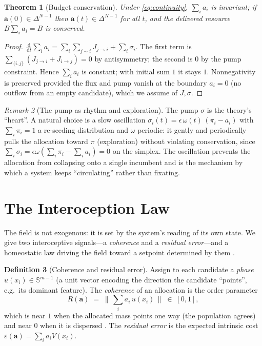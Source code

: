 \documentclass[11pt,a4paper]{article}
\theoremstyle{plain}
\newtheorem{theorem}{Theorem}[section]
\theoremstyle{definition}
\newtheorem{definition}[theorem]{Definition}
\theoremstyle{remark}
\newtheorem{remark}[theorem]{Remark}
\newcommand{\Unit}{[0,1]}
\newcommand{\simplex}{\Delta}                 %
\newcommand{\alloc}{\mathbf{a}}               %
\newcommand{\coh}{R}                           %
\newcommand{\dd}{\,\mathrm{d}}
\begin{document}
\begin{theorem}[Budget conservation]
\label{thm:conservation}
Under \cref{eq:continuity}, $\sum_i a_i$ is invariant; if $\alloc(0)\in
\simplex^{N-1}$ then $\alloc(t)\in\simplex^{N-1}$ for all $t$, and the delivered
resource $B\sum_i a_i=B$ is conserved.
\end{theorem}
\begin{proof}
$\frac{\dd}{\dd t}\sum_i a_i=\sum_i\sum_{j\sim i}J_{j\to i}+\sum_i\sigma_i$. The
first term is $\sum_{\{i,j\}}(J_{j\to i}+J_{i\to j})=0$ by antisymmetry; the
second is $0$ by the pump constraint. Hence $\sum_i a_i$ is constant; with
initial sum $1$ it stays $1$. Nonnegativity is preserved provided the flux and
pump vanish at the boundary $a_i=0$ (no outflow from an empty candidate), which
we assume of $J,\sigma$.
\end{proof}

\begin{remark}[The pump as rhythm and exploration]
The pump $\sigma$ is the theory's ``heart''. A natural choice is a slow
oscillation $\sigma_i(t)=\epsilon\,\omega(t)\,(\pi_i-a_i)$ with
$\sum_i\pi_i=1$ a re-seeding distribution and $\omega$ periodic: it gently and
periodically pulls the allocation toward $\pi$ (exploration) without violating
conservation, since $\sum_i\sigma_i=\epsilon\omega(\sum_i\pi_i-\sum_i a_i)=0$ on
the simplex. The oscillation prevents the allocation from collapsing onto a
single incumbent and is the mechanism by which a system keeps ``circulating''
rather than fixating.
\end{remark}

\section{The Interoception Law}
\label{sec:interoception}

The field is not exogenous: it is set by the system's reading of its own state.
We give two interoceptive signals---a \emph{coherence} and a \emph{residual
error}---and a homeostatic law driving the field toward a setpoint determined by
them \citep{cannon1929,ashby1960,astrom2008}.

\begin{definition}[Coherence and residual error]
\label{def:coherence}
Assign to each candidate a \emph{phase} $u(x_i)\in\mathbb{S}^{m-1}$ (a unit
vector encoding the direction the candidate ``points'', e.g.\ its dominant
feature). The \emph{coherence} of an allocation is the order parameter
\begin{equation}
\coh(\alloc)\;=\;\Big\lVert\,\sum_i a_i\,u(x_i)\,\Big\rVert\;\in\;\Unit,
\label{eq:coherence}
\end{equation}
which is near $1$ when the allocated mass points one way (the population agrees)
and near $0$ when it is dispersed \citep{kuramoto1984,strogatz2000,winfree1980}.
The \emph{residual error} is the expected intrinsic cost
$\varepsilon(\alloc)=\sum_i a_i V(x_i)$.
\end{definition}
\end{document}
